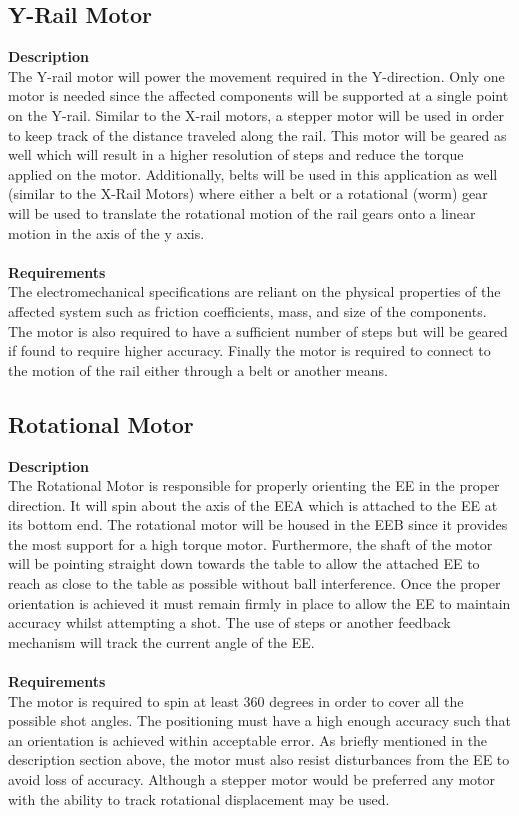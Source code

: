 \documentclass[titlepage]{article}
\begin{document}
\subsection{Y-Rail Motor}
\textbf{Description}\\
The Y-rail motor will power the movement required in the Y-direction. Only one motor is needed since the affected components will be supported at a single point on the Y-rail. Similar to the X-rail motors, a stepper motor will be used in order to keep track of the distance traveled along the rail. This motor will be geared as well which will result in a higher resolution of steps and reduce the torque applied on the motor. Additionally, belts will be used in this application as well (similar to the X-Rail Motors) where either a belt or a rotational (worm) gear will be used to translate the rotational motion of the rail gears onto a linear motion in the axis of the y axis.\\~\\
\textbf{Requirements}\\
The electromechanical specifications are reliant on the physical properties of the affected system such as friction coefficients, mass, and size of the components. The motor is also required to have a sufficient number of steps but will be geared if found to require higher accuracy. Finally the motor is required to connect to the motion of the rail either through a belt or another means.

\subsection{Rotational Motor}
\textbf{Description}\\
The Rotational Motor is responsible for properly orienting the EE in the proper direction. It will spin about the axis of the EEA which is attached to the EE at its bottom end. The rotational motor will be housed in the EEB since it provides the most support for a high torque motor. Furthermore, the shaft of the motor will be pointing straight down towards the table to allow the attached EE to reach as close to the table as possible without ball interference. Once the proper orientation is achieved it must remain firmly in place to allow the EE to maintain accuracy whilst attempting a shot. The use of steps or another feedback mechanism will track the current angle of the EE.\\~\\
\textbf{Requirements}\\
The motor is required to spin at least 360 degrees in order to cover all the possible shot angles. The positioning must have a high enough accuracy such that an orientation is achieved within acceptable error. As briefly mentioned in the description section above, the motor must also resist disturbances from the EE to avoid loss of accuracy. Although a stepper motor would be preferred any motor with the ability to track rotational displacement may be used.
\end{document}
